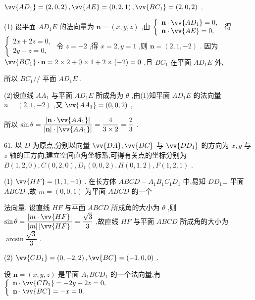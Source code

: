 $\vv{A{D}_{1}} = \left( {2,0,2}\right) ,\vv{AE} = \left( {0,2,1}\right) ,\vv{B{C}_{1}} = \left( {2,0,2}\right)$ .

(1) 设平面 $A{D}_{1}E$ 的法向量为 $\mathbf{n} = \left( {x,y,z}\right)$ ,由 $\left\{  \begin{array}{l} \mathbf{n} \cdot  \vv{A{D}_{1}} = 0, \\  \mathbf{n} \cdot  \vv{AE} = 0, \end{array}\right.$ 得 $\left\{  \begin{array}{l} {2x} + {2z} = 0, \\  {2y} + z = 0, \end{array}\right.$ 令 $z =  - 2$ ,得 $x = 2,y = 1$ ,则 $\mathbf{n} = \left( {2,1, - 2}\right)$ . 因为 $\vv{B{C}_{1}} \cdot  \mathbf{n} = 2 \times  2 + 0 \times  1 + 2 \times  \left( {-2}\right)  = 0$ ,且 $B{C}_{1}$ 在平面 $A{D}_{1}E$ 外,

所以 $B{C}_{1}//$ 平面 $A{D}_{1}E$ .

(2)设直线 $A{A}_{1}$ 与平面 $A{D}_{1}E$ 所成角为 $\theta$ ,由(1)知平面 $A{D}_{1}E$ 的法向量 $n = \left( {2,1, - 2}\right)$ ,又 $\vv{A{A}_{1}} = \left( {0,0,2}\right)$ ,

所以 $\sin \theta  = \dfrac{\left| \mathbf{n} \cdot  \vv{A{A}_{1}}\right| }{\left| \mathbf{n}\right|  \cdot  \left| \vv{A{A}_{1}}\right| } = \dfrac{4}{3 \times  2} = \dfrac{2}{3}$ .

61. 以 $D$ 为原点,分别以向量 $\vv{DA},\vv{DC}$ 与 $\vv{D{D}_{1}}$ 的方向为 $x,y$ 与 $z$ 轴的正方向,建立空间直角坐标系,可得有关点的坐标分别为 $B\left( {1,2,0}\right) ,C\left( {0,2,0}\right) ,{D}_{1}\left( {0,0,2}\right) ,H\left( {0,1,2}\right) ,F\left( {1,2,1}\right)$ .

(1) $\vv{HF} = \left( {1,1, - 1}\right)$ . 在长方体 ${ABCD} - {A}_{1}{B}_{1}{C}_{1}{D}_{1}$ 中,易知 $D{D}_{1} \bot$ 平面 ${ABCD}$ ,故 $m = \left( {0,0,1}\right)$ 为平面 ${ABCD}$ 的一个

法向量. 设直线 ${HF}$ 与平面 ${ABCD}$ 所成角的大小为 $\theta$ ,则 $\sin \theta  = \dfrac{\left| m \cdot  \vv{HF}\right| }{\left| m\right| \left| \vv{HF}\right| } = \dfrac{\sqrt{3}}{3}$ ,故直线 ${HF}$ 与平面 ${ABCD}$ 所成角的大小为 $\arcsin \dfrac{\sqrt{3}}{3}$ .

(2) $\vv{C{D}_{1}} = \left( {0, - 2,2}\right) ,\vv{BC} = \left( {-1,0,0}\right)$ .

设 $\mathbf{n} = \left( {x,y,z}\right)$ 是平面 ${A}_{1}{BC}{D}_{1}$ 的一个法向量,有 $\left\{  \begin{array}{l} \mathbf{n} \cdot  \vv{C{D}_{1}} =  - {2y} + {2z} = 0, \\  \mathbf{n} \cdot  \vv{BC} =  - x = 0. \end{array}\right.$

